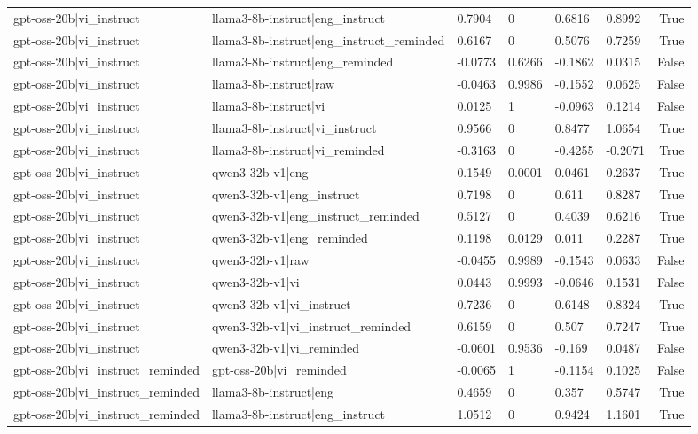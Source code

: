 \begin{table}
\begin{tabular}{llllllr}
gpt-oss-20b|vi_instruct & llama3-8b-instruct|eng_instruct & 0.7904 & 0 & 0.6816 & 0.8992 & True \\
gpt-oss-20b|vi_instruct & llama3-8b-instruct|eng_instruct_reminded & 0.6167 & 0 & 0.5076 & 0.7259 & True \\
gpt-oss-20b|vi_instruct & llama3-8b-instruct|eng_reminded & -0.0773 & 0.6266 & -0.1862 & 0.0315 & False \\
gpt-oss-20b|vi_instruct & llama3-8b-instruct|raw & -0.0463 & 0.9986 & -0.1552 & 0.0625 & False \\
gpt-oss-20b|vi_instruct & llama3-8b-instruct|vi & 0.0125 & 1 & -0.0963 & 0.1214 & False \\
gpt-oss-20b|vi_instruct & llama3-8b-instruct|vi_instruct & 0.9566 & 0 & 0.8477 & 1.0654 & True \\
gpt-oss-20b|vi_instruct & llama3-8b-instruct|vi_reminded & -0.3163 & 0 & -0.4255 & -0.2071 & True \\
gpt-oss-20b|vi_instruct & qwen3-32b-v1|eng & 0.1549 & 0.0001 & 0.0461 & 0.2637 & True \\
gpt-oss-20b|vi_instruct & qwen3-32b-v1|eng_instruct & 0.7198 & 0 & 0.611 & 0.8287 & True \\
gpt-oss-20b|vi_instruct & qwen3-32b-v1|eng_instruct_reminded & 0.5127 & 0 & 0.4039 & 0.6216 & True \\
gpt-oss-20b|vi_instruct & qwen3-32b-v1|eng_reminded & 0.1198 & 0.0129 & 0.011 & 0.2287 & True \\
gpt-oss-20b|vi_instruct & qwen3-32b-v1|raw & -0.0455 & 0.9989 & -0.1543 & 0.0633 & False \\
gpt-oss-20b|vi_instruct & qwen3-32b-v1|vi & 0.0443 & 0.9993 & -0.0646 & 0.1531 & False \\
gpt-oss-20b|vi_instruct & qwen3-32b-v1|vi_instruct & 0.7236 & 0 & 0.6148 & 0.8324 & True \\
gpt-oss-20b|vi_instruct & qwen3-32b-v1|vi_instruct_reminded & 0.6159 & 0 & 0.507 & 0.7247 & True \\
gpt-oss-20b|vi_instruct & qwen3-32b-v1|vi_reminded & -0.0601 & 0.9536 & -0.169 & 0.0487 & False \\
gpt-oss-20b|vi_instruct_reminded & gpt-oss-20b|vi_reminded & -0.0065 & 1 & -0.1154 & 0.1025 & False \\
gpt-oss-20b|vi_instruct_reminded & llama3-8b-instruct|eng & 0.4659 & 0 & 0.357 & 0.5747 & True \\
gpt-oss-20b|vi_instruct_reminded & llama3-8b-instruct|eng_instruct & 1.0512 & 0 & 0.9424 & 1.1601 & True \\

\end{tabular}
\end{table}
